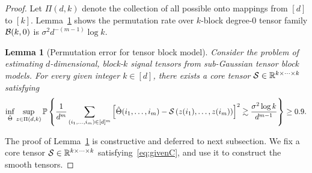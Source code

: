 \documentclass[12pt]{article}
\newtheorem{lem}{Lemma}
\theoremstyle{definition}
\begin{document}
\begin{proof}
Let $\Pi(d,k)$ denote the collection of all possible onto mappings from $[d]$ to $[k]$.
Lemma~\ref{lem:permutation} shows the permutation rate over  $k$-block degree-0 tensor family $\mathcal{B}(k,0)$ is $\sigma^2 d^{-(m-1)}\log k$. 
\begin{lem}[Permutation error for tensor block model]\label{lem:permutation}
Consider the problem of estimating $d$-dimensional, block-$k$ signal tensors from sub-Gaussian tensor block models.
For every given integer $k\in[d]$, there exists a core tensor $\mathcal{S}\in\mathbb{R}^{k\times \cdots \times k}$ satisfying
\begin{equation}\label{eq:givenC}
\inf_{\hat \Theta}\sup_{z \in \Pi(d,k)}\mathbb{P}\left\{{1\over d^m}\sum_{(i_1,\ldots,i_m)\in[d]^m}\left[\hat \Theta(i_1,\ldots,i_m)-\mathcal{S}\left(z(i_1),\ldots,z(i_m)\right)\right]^2\gtrsim \frac{\sigma^2\log k} {d^{m-1}}\right\}\geq 0.9.
\end{equation}
\end{lem}
The proof of Lemma~\ref{lem:permutation} is constructive and deferred to next subsection. We fix a core tensor $\mathcal{S}\in\mathbb{R}^{k\times \cdots \times k}$ satisfying~\eqref{eq:givenC}, and use it to construct the smooth tensors. 


\end{proof}
\end{document}
